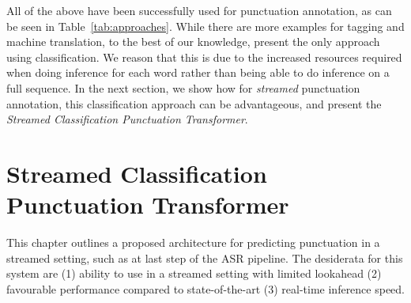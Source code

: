 \documentclass[bsc,deptreport,ai]{infthesis} %
\begin{document}
All of the above have been successfully used for punctuation annotation, as can be seen in Table~\ref{tab:approaches}. While there are more examples for tagging and machine translation, to the best of our knowledge, \citet{che2016} present the only approach using classification. We reason that this is due to the increased resources required when doing inference for each word rather than being able to do inference on a full sequence. In the next section, we show how for \emph{streamed} punctuation annotation, this classification approach can be advantageous, and present the \emph{Streamed Classification Punctuation Transformer}.


\chapter{Streamed Classification Punctuation Transformer}
This chapter outlines a proposed architecture for predicting punctuation in a streamed setting, such as at last step of the ASR pipeline. The desiderata for this system are (1) ability to use in a streamed setting with limited lookahead (2) favourable performance compared to state-of-the-art (3) real-time inference speed.
\end{document}
